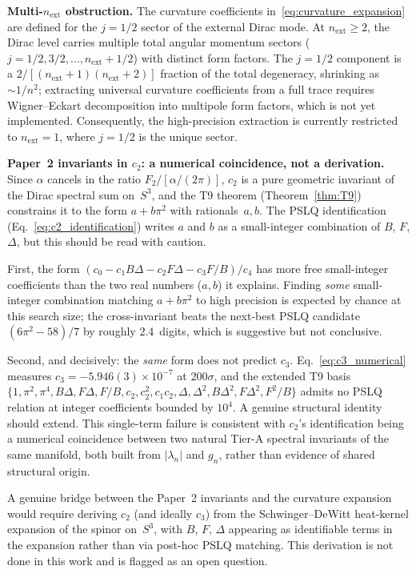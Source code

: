 \documentclass[11pt]{article}
\begin{document}
\medskip
\noindent\textbf{Multi-$n_{\mathrm{ext}}$ obstruction.}
The curvature coefficients in~\eqref{eq:curvature_expansion} are
defined for the $j = 1/2$ sector of the external Dirac mode.  At
$n_{\mathrm{ext}} \ge 2$, the Dirac level carries multiple total
angular momentum sectors ($j = 1/2, 3/2, \ldots, n_{\mathrm{ext}}+1/2$)
with distinct form factors.  The $j = 1/2$ component is a
$2/[(n_{\mathrm{ext}}+1)(n_{\mathrm{ext}}+2)]$ fraction of the total
degeneracy, shrinking as $\sim 1/n^2$; extracting universal curvature
coefficients from a full trace requires Wigner--Eckart decomposition
into multipole form factors, which is not yet implemented.
Consequently, the high-precision extraction is currently restricted to
$n_{\mathrm{ext}} = 1$, where $j = 1/2$ is the unique sector.

\medskip
\noindent\textbf{Paper~2 invariants in $c_2$: a numerical coincidence,
not a derivation.}
Since $\alpha$ cancels in the ratio $F_2/[\alpha/(2\pi)]$, $c_2$ is a
pure geometric invariant of the Dirac spectral sum on~$S^3$, and the
T9 theorem (Theorem~\ref{thm:T9}) constrains it to the form
$a + b\pi^2$ with rationals~$a, b$.  The PSLQ identification
(Eq.~\ref{eq:c2_identification}) writes $a$ and $b$ as a small-integer
combination of $B$, $F$, $\Delta$, but this should be read with
caution.

First, the form
$(c_0 - c_1 B\Delta - c_2 F\Delta - c_3 F/B)/c_4$ has more free
small-integer coefficients than the two real numbers ($a, b$) it
explains.  Finding \emph{some} small-integer combination matching
$a + b\pi^2$ to high precision is expected by chance at this search
size; the cross-invariant beats the next-best PSLQ candidate
$(6\pi^2 - 58)/7$ by roughly 2.4~digits, which is suggestive but not
conclusive.

Second, and decisively: the \emph{same} form does not predict $c_3$.
Eq.~\eqref{eq:c3_numerical} measures $c_3 = -5.946(3)\times 10^{-7}$ at
$200\sigma$, and the extended T9 basis
$\{1, \pi^2, \pi^4, B\Delta, F\Delta, F/B, c_2, c_2^2, c_1 c_2,
\Delta, \Delta^2, B\Delta^2, F\Delta^2, F^2/B\}$ admits no
PSLQ relation at integer coefficients bounded by $10^4$.  A genuine
structural identity should extend.  This single-term failure is
consistent with $c_2$'s identification being a numerical coincidence
between two natural Tier-A spectral invariants of the same manifold,
both built from $|\lambda_n|$ and $g_n$, rather than evidence of
shared structural origin.

A genuine bridge between the Paper~2 invariants and the curvature
expansion would require deriving $c_2$ (and ideally $c_3$) from the
Schwinger--DeWitt heat-kernel expansion of the spinor on~$S^3$, with
$B$, $F$, $\Delta$ appearing as identifiable terms in the expansion
rather than via post-hoc PSLQ matching.  This derivation is not done
in this work and is flagged as an open question.
\end{document}
